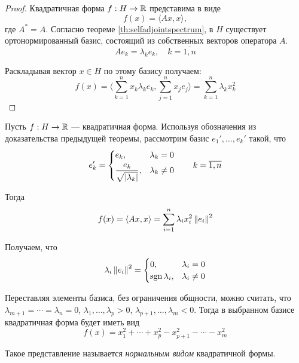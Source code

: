 \begin{proof}
    Квадратичная форма $f : H \to \mathbb{R}$ представима в виде
    \[ f(x) = \langle Ax, x\rangle, \]
    где $A^* = A$. Согласно теореме \ref{th:selfadjointspectrum}, в $H$ существует
    ортонормированный базис, состоящий из собственных векторов оператора $A$.
    \[ Ae_k = \lambda_k e_k, \quad k = \overline{1,n} \]

    Раскладывая вектор $x\in H$ по этому базису получаем:
    \[ f(x) = \langle \sum_{k=1}^n x_k \lambda_k e_k, \sum_{j=1}^n x_j
    e_j\rangle = \sum_{k=1}^n \lambda_k x_k^2 \]
\end{proof}

\begin{remark}
    Пусть $f: H \to \mathbb{R}$ --- квадратичная форма. Используя обозначения из
    доказательства предыдущей теоремы, рассмотрим базис $e_1', \dotsc, e_k'$
    такой, что
    \[ e_k' = 
        \begin{cases}
            e_k, & \lambda_k = 0 \\[0.3em]
            \dfrac{e_k}{\sqrt{\left|\lambda_k\right|}}, & \lambda_k \neq 0
    \end{cases} \quad\quad k = \overline{1,n} \]

    Тогда
    \[ f(x) = \left< Ax, x\right> = \sum_{i=1}^n \lambda_i x_i^2 \left\|e_i\right\|^2
    \]

    Получаем, что
    \[ \lambda_i\left\|e_i\right\|^2 =
        \begin{cases}
            0, & \lambda_i = 0 \\
            \operatorname{sgn} \lambda_i, & \lambda_i \neq 0
    \end{cases} \]
    
    Переставляя элементы базиса, без ограничения общности, можно считать, что
    $\lambda_{m+1} = \dotsb = \lambda_{n} = 0$, $\lambda_1, \dotsc, \lambda_p >
    0$, $\lambda_{p+1}, \dotsc, \lambda_m < 0$. Тогда в выбранном базисе
    квадратичная форма будет иметь вид
    \[ f(x) = x_1^2 + \dotsb + x_p^2 - x_{p+1}^2 - \dotsb - x_m^2 \]

    Такое представление называется \emph{нормальным видом} квадратичной формы.
\end{remark}
